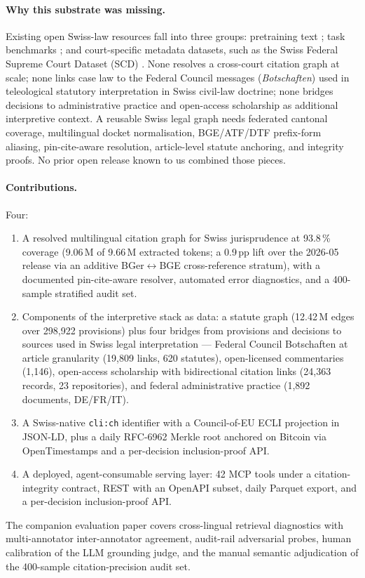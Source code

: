 \documentclass[11pt,a4paper]{article}
\begin{document}
\paragraph{Why this substrate was missing.} Existing open Swiss-law resources fall into three groups: pretraining text \citep{niklaus2023}; task benchmarks \citep{niklaus2021,stern2024,rolshoven2025,niklaus2025swiltra}; and court-specific metadata datasets, such as the Swiss Federal Supreme Court Dataset (SCD) \citep{geering2024scd}. None resolves a cross-court citation graph at scale; none links case law to the Federal Council messages (\emph{Botschaften}) used in teleological statutory interpretation in Swiss civil-law doctrine; none bridges decisions to administrative practice and open-access scholarship as additional interpretive context. A reusable Swiss legal graph needs federated cantonal coverage, multilingual docket normalisation, BGE/ATF/DTF prefix-form aliasing, pin-cite-aware resolution, article-level statute anchoring, and integrity proofs. No prior open release known to us combined those pieces.

\paragraph{Contributions.} Four:
\begin{enumerate}\setlength{\itemsep}{1pt}\setlength{\parskip}{0pt}
\item A resolved multilingual citation graph for Swiss jurisprudence at 93.8\,\% coverage (9.06\,M of 9.66\,M extracted tokens; a 0.9\,pp lift over the 2026-05 release via an additive BGer$\leftrightarrow$BGE cross-reference stratum), with a documented pin-cite-aware resolver, automated error diagnostics, and a 400-sample stratified audit set.
\item Components of the interpretive stack as data: a statute graph (12.42\,M edges over 298{,}922 provisions) plus four bridges from provisions and decisions to sources used in Swiss legal interpretation --- Federal Council Botschaften at article granularity (19{,}809 links, 620 statutes), open-licensed commentaries (1{,}146), open-access scholarship with bidirectional citation links (24{,}363 records, 23 repositories), and federal administrative practice (1{,}892 documents, DE/FR/IT).
\item A Swiss-native \texttt{cli:ch} identifier with a Council-of-EU ECLI projection in JSON-LD, plus a daily RFC-6962 Merkle root anchored on Bitcoin via OpenTimestamps and a per-decision inclusion-proof API.
\item A deployed, agent-consumable serving layer: 42 MCP tools under a citation-integrity contract, REST with an OpenAPI subset, daily Parquet export, and a per-decision inclusion-proof API.
\end{enumerate}
The companion evaluation paper covers cross-lingual retrieval diagnostics with multi-annotator inter-annotator agreement, audit-rail adversarial probes, human calibration of the LLM grounding judge, and the manual semantic adjudication of the 400-sample citation-precision audit set.
\end{document}
